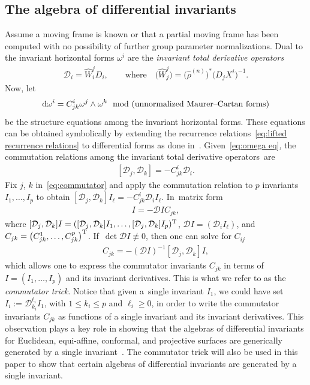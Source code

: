 \documentclass[10pt,a4paper]{amsart}
\numberwithin{equation}{section}
\newcommand{\D}{\mathcal{D}}
\newcommand{\n}{^{(n)}}
\begin{document}
\subsection{The algebra of differential invariants}

Assume a moving frame is known or that a partial moving frame has been computed with no possibility of further group parameter normalizations. Dual to the invariant horizontal forms $\omega^i$ are the \emph{invariant total derivative operators}
\begin{gather}\label{eq:invariant derivative operators}
\D_i = \widehat{W}^j_i D_i,\qquad \text{where}\quad \big(\widehat{W}^j_j\big) = \big(\widehat{\rho}\n\big)^*\big(D_j X^i\big)^{-1}.
\end{gather}
Now, let
%
\begin{gather}\label{eq:omega eq}
{\rm d}\omega^i = C^i_{jk} \omega^j\wedge\omega^k
\mod(\text{unnormalized Maurer--Cartan forms})
\end{gather}
%
be the structure equations among the invariant horizontal forms. These equations can be obtai\-ned symbolically by extending the recurrence relations~\eqref{eq:lifted recurrence relations} to differential forms as done in~\cite{KO-2003}. Given~\eqref{eq:omega eq}, the commutation relations among the invariant total derivative opera\-tors~are
%
\begin{gather}\label{eq:commutator}
[\D_j,\D_k]=-C^i_{jk} \D_i.
\end{gather}
%
Fix $j$, $k$ in~\eqref{eq:commutator} and apply the commutation relation to $p$ invariants $I_1,\dots,I_p$
to obtain $[\D_j,\D_k]I_\ell = -C^i_{jk} \D_i I_\ell$. In~matrix form
\begin{gather*}
[\D_j,\D_k] I = - \D I C_{jk},
\end{gather*}
where $[\D_j,\D_k] I = ([\D_j,\D_k] I_1,\dots,[\D_j,\D_k] I_p)^{\rm T}$, $\D I = (\D_i I_\ell)$, and $C_{jk} = \big(C^1_{jk},\dots, C^p_{jk}\big)^{\rm T}$. If~$\det \D I \not\equiv 0$, then one can solve for $C_{ij}$
%
\begin{gather}\label{eq:commutator trick}
C_{jk} = -(\D I)^{-1} [\D_j,\D_k] I,
\end{gather}
%
which allows one to express the commutator invariants $C_{jk}$ in terms of $I=(I_1,\dots,I_p)$ and its invariant derivatives. This is what we refer to as the \emph{commutator trick}. Notice that given a~single invariant $I_1$, we could have set $I_i:=\D_{k_i}^{\ell_i} I_1$, with $1\leq k_i \leq p$ and $\ell_i\geq 0$, in order to write the commutator invariants $C_{jk}$ as functions of a single invariant and its invariant derivatives. This observation plays a key role in showing that the algebras of differential invariants for Euclidean, equi-affine, conformal, and projective surfaces are generically generated by a single invariant~\cite{HO-2007,O-2009diff,O-2016}. The commutator trick will also be used in this paper to show that certain algebras of differential invariants are generated by a single invariant.
\end{document}
